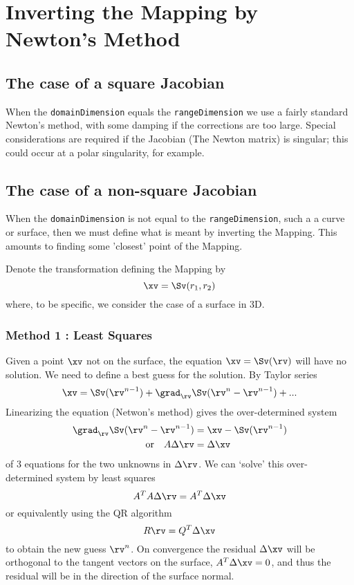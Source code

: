 \section{Inverting the Mapping by Newton's Method}

\subsection{The case of a square Jacobian}

  When the {\tt domainDimension} equals the {\tt rangeDimension} we use a fairly standard
Newton's method, with some damping if the corrections are too large. Special considerations
are required if the Jacobian (The Newton matrix) is singular; this could occur at a polar
singularity, for example.

\subsection{The case of a non-square Jacobian}

When the {\tt domainDimension} is not equal to the {\tt rangeDimension}, such a a curve
or surface, then we must define what is meant by inverting the Mapping. This amounts 
to finding some 'closest' point of the Mapping.

Denote the transformation defining the Mapping by
\[
     \xv = \Sv(r_1,r_2)
\]
where, to be specific, we consider the case of a surface in 3D.

\subsubsection{Method 1 : Least Squares}

Given a point $\xv$ not on the surface, the equation $\xv=\Sv(\rv)$
will have no solution. We need to define a best guess for the solution.
By Taylor series
\[
   \xv=\Sv(\rv^{n-1}) + \grad_\rv \Sv (\rv^n-\rv^{n-1}) + ...
\]
Linearizing the equation (Netwon's method) gives the over-determined
system
\begin{align*}
    \grad_\rv \Sv (\rv^n-\rv^{n-1}) & = \xv-\Sv(\rv^{n-1}) \\
  \mbox{or~~~}  A \Delta \rv & =  \Delta \xv 
\end{align*}
of 3 equations for the two unknowns in $\Delta \rv$.
We can `solve' this over-determined system by least squares
\[
    A^T A \Delta \rv = A^T \Delta \xv
\]
or equivalently using the QR algorithm
\[
    R \rv = Q^T \Delta \xv
\]
to obtain the new guess $\rv^{n}$.
On convergence the residual $\Delta\xv$ will be orthogonal to the tangent vectors
on the surface, $A^T\Delta\xv=0$, and thus the residual will be in the direction 
of the surface normal.

